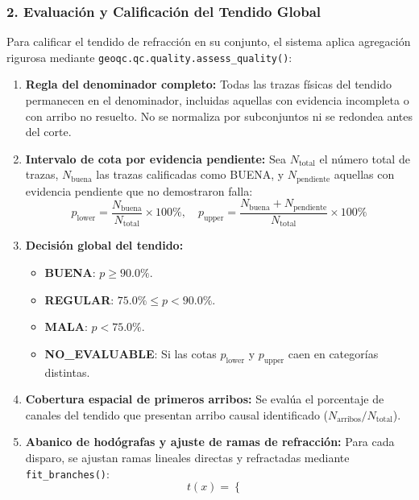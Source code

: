 \documentclass[11pt,a4paper]{article}
\begin{document}
\subsubsection{2. Evaluación y Calificación del Tendido Global}
Para calificar el tendido de refracción en su conjunto, el sistema aplica agregación rigurosa mediante \texttt{geoqc.qc.quality.assess\_quality()}:
\begin{enumerate}
    \item \textbf{Regla del denominador completo:} Todas las trazas físicas del tendido permanecen en el denominador, incluidas aquellas con evidencia incompleta o con arribo no resuelto. No se normaliza por subconjuntos ni se redondea antes del corte.
    \item \textbf{Intervalo de cota por evidencia pendiente:}
    Sea $N_{\text{total}}$ el número total de trazas, $N_{\text{buena}}$ las trazas calificadas como BUENA, y $N_{\text{pendiente}}$ aquellas con evidencia pendiente que no demostraron falla:
    \begin{equation}
        p_{\text{lower}} = \frac{N_{\text{buena}}}{N_{\text{total}}} \times 100\%, \quad p_{\text{upper}} = \frac{N_{\text{buena}} + N_{\text{pendiente}}}{N_{\text{total}}} \times 100\%
    \end{equation}
    \item \textbf{Decisión global del tendido:}
    \begin{itemize}
        \item \textcolor{usablegreen}{\textbf{BUENA}}: $p \ge 90.0\%$.
        \item \textcolor{reviewamber}{\textbf{REGULAR}}: $75.0\% \le p < 90.0\%$.
        \item \textcolor{badred}{\textbf{MALA}}: $p < 75.0\%$.
        \item \textcolor{unusablegrey}{\textbf{NO\_EVALUABLE}}: Si las cotas $p_{\text{lower}}$ y $p_{\text{upper}}$ caen en categorías distintas.
    \end{itemize}
    \item \textbf{Cobertura espacial de primeros arribos:}
    Se evalúa el porcentaje de canales del tendido que presentan arribo causal identificado ($N_{\text{arribos}} / N_{\text{total}}$).
    \item \textbf{Abanico de hodógrafas y ajuste de ramas de refracción:}
    Para cada disparo, se ajustan ramas lineales directas y refractadas mediante \texttt{fit\_branches()}:
    \begin{equation}
        t(x) = \begin{cases}

\end{cases}
\end{equation}
\end{enumerate}
\end{document}
